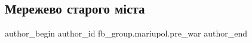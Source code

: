  
 
 
 
 

\subsection{Мережево старого міста}
\label{sec:18_02_2023.fb.fb_group.mariupol.pre_war.5.merezhevo_starogo_m_}

\ifcmt
 author_begin
   author_id fb_group.mariupol.pre_war
 author_end
\fi
